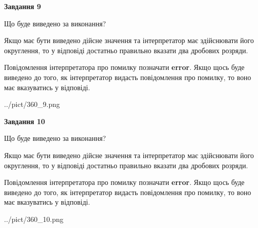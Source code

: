 \documentclass[12pt, ukrainian]{article}
\begin{document}
{\begin {Large}
{\begin {center}\textbf{Завдання 9}\end {center}}\par
Що буде виведено за виконання? \par

Якщо має бути виведено дійсне значення та інтерпретатор має здійснювати його округлення, 
то у відповіді достатньо правильно вказати два дробових розряди.

Повідомлення інтерпретатора про помилку позначати \textbf{error}.
Якщо щось буде виведено до того, як інтерпретатор видасть повідомлення про помилку, 
то воно має вказуватись у відповіді. \par

\begin{center}
	{../pict/360_9.png}
\end{center}
\newpage

{\begin {center}\textbf{Завдання 10}\end {center}}\par
Що буде виведено за виконання? \par

Якщо має бути виведено дійсне значення та інтерпретатор має здійснювати його округлення, 
то у відповіді достатньо правильно вказати два дробових розряди.

Повідомлення інтерпретатора про помилку позначати \textbf{error}.
Якщо щось буде виведено до того, як інтерпретатор видасть повідомлення про помилку, 
то воно має вказуватись у відповіді. \par

\begin{center}
	{../pict/360_10.png}
\end{center}
\newpage

\end {Large}}
\end{document}
